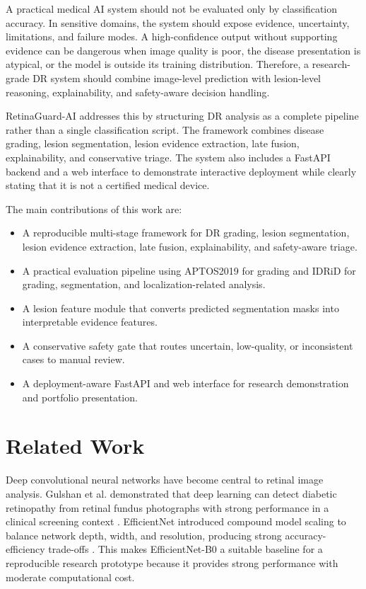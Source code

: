 \documentclass[conference]{IEEEtran}
\begin{document}
A practical medical AI system should not be evaluated only by classification accuracy. In sensitive domains, the system should expose evidence, uncertainty, limitations, and failure modes. A high-confidence output without supporting evidence can be dangerous when image quality is poor, the disease presentation is atypical, or the model is outside its training distribution. Therefore, a research-grade DR system should combine image-level prediction with lesion-level reasoning, explainability, and safety-aware decision handling.

RetinaGuard-AI addresses this by structuring DR analysis as a complete pipeline rather than a single classification script. The framework combines disease grading, lesion segmentation, lesion evidence extraction, late fusion, explainability, and conservative triage. The system also includes a FastAPI backend and a web interface to demonstrate interactive deployment while clearly stating that it is not a certified medical device.

The main contributions of this work are:
\begin{itemize}
    \item A reproducible multi-stage framework for DR grading, lesion segmentation, lesion evidence extraction, late fusion, explainability, and safety-aware triage.
    \item A practical evaluation pipeline using APTOS2019 for grading and IDRiD for grading, segmentation, and localization-related analysis.
    \item A lesion feature module that converts predicted segmentation masks into interpretable evidence features.
    \item A conservative safety gate that routes uncertain, low-quality, or inconsistent cases to manual review.
    \item A deployment-aware FastAPI and web interface for research demonstration and portfolio presentation.
\end{itemize}

\section{Related Work}
Deep convolutional neural networks have become central to retinal image analysis. Gulshan et al. demonstrated that deep learning can detect diabetic retinopathy from retinal fundus photographs with strong performance in a clinical screening context \cite{gulshan2016dr}. EfficientNet introduced compound model scaling to balance network depth, width, and resolution, producing strong accuracy-efficiency trade-offs \cite{tan2019efficientnet}. This makes EfficientNet-B0 a suitable baseline for a reproducible research prototype because it provides strong performance with moderate computational cost.
\end{document}
